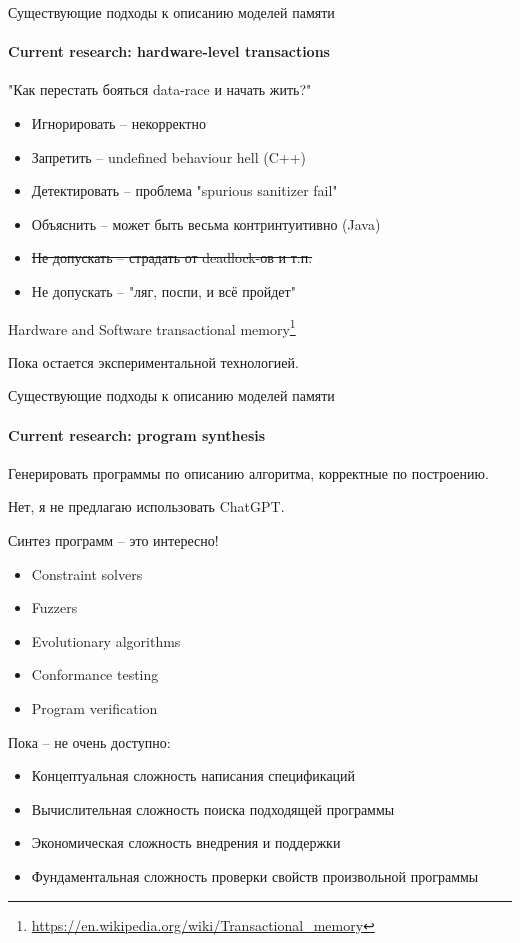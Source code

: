 \begin{frame}[t,noframenumbering]{Существующие подходы к описанию моделей памяти}
\framesubtitle{Current research: hardware-level transactions}

"Как перестать бояться data-race и начать жить?"

\begin{itemize}
	\item Игнорировать -- некорректно
	\item Запретить -- undefined behaviour hell (C++)
	\item Детектировать -- проблема "spurious sanitizer fail"
	\item Объяснить -- может быть весьма контринтуитивно (Java)
	
	\item \sout{Не допускать -- страдать от deadlock-ов и т.п.}

	\pause
	\item Не допускать -- "ляг, поспи, и всё пройдет"
\end{itemize}

\pause
Hardware and Software transactional memory\footnote<3->{\tiny\url{https://en.wikipedia.org/wiki/Transactional_memory}}

\pause
Пока остается экспериментальной технологией.

\end{frame}


\begin{frame}{Существующие подходы к описанию моделей памяти}
\framesubtitle{Current research: program synthesis}

Генерировать программы по описанию алгоритма, корректные по построению.

\pause
Нет, я не предлагаю использовать ChatGPT.

\pause
Синтез программ -- это интересно!
\begin{itemize}
	\item Constraint solvers
	\item Fuzzers
	\item Evolutionary algorithms
	\item Conformance testing
	\item Program verification
\end{itemize}

\pause
Пока -- не очень доступно:
\begin{itemize}
	\item Концептуальная сложность написания спецификаций
	\item Вычислительная сложность поиска подходящей программы
	\item Экономическая сложность внедрения и поддержки
	\item Фундаментальная сложность проверки свойств произвольной программы
\end{itemize}

\end{frame}

